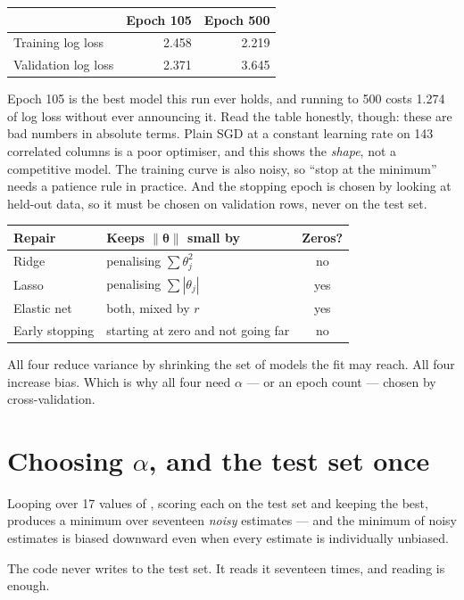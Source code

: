 \documentclass[11pt,a4paper]{article}
\begin{document}
\begin{center}
\small
\begin{tabular}{lrr}
\toprule
& \textbf{Epoch 105} & \textbf{Epoch 500} \\
\midrule
Training log loss   & 2.458 & 2.219 \\
Validation log loss & 2.371 & 3.645 \\
\bottomrule
\end{tabular}
\end{center}

Epoch 105 is the best model this run ever holds, and running to 500 costs 1.274
of log loss without ever announcing it. Read the table honestly, though: these
are bad numbers in absolute terms. Plain SGD at a constant learning rate on 143
correlated columns is a poor optimiser, and this shows the \emph{shape}, not a
competitive model. The training curve is also noisy, so ``stop at the minimum''
needs a patience rule in practice. And the stopping epoch is chosen by looking
at held-out data, so it must be chosen on validation rows, never on the test
set.

\begin{center}
\small
\begin{tabular}{llc}
\toprule
\textbf{Repair} & \textbf{Keeps $\lVert\boldsymbol\theta\rVert$ small by} &
\textbf{Zeros?} \\
\midrule
Ridge          & penalising $\sum\theta_j^2$ & no \\
Lasso          & penalising $\sum|\theta_j|$ & yes \\
Elastic net    & both, mixed by $r$ & yes \\
Early stopping & starting at zero and not going far & no \\
\bottomrule
\end{tabular}
\end{center}

All four reduce variance by shrinking the set of models the fit may reach. All
four increase bias. Which is why all four need $\alpha$ --- or an epoch count
--- chosen by cross-validation.

\section{Choosing $\alpha$, and the test set once}

\begin{failbox}[title={Failure condition --- a hyperparameter chosen on the rows you then report}]
Looping over 17 values of , scoring each on the test set and keeping
the best, produces a minimum over seventeen \emph{noisy} estimates --- and the
minimum of noisy estimates is biased downward even when every estimate is
individually unbiased.

The code never writes to the test set. It reads it seventeen times, and reading
is enough.
\end{failbox}
\end{document}
